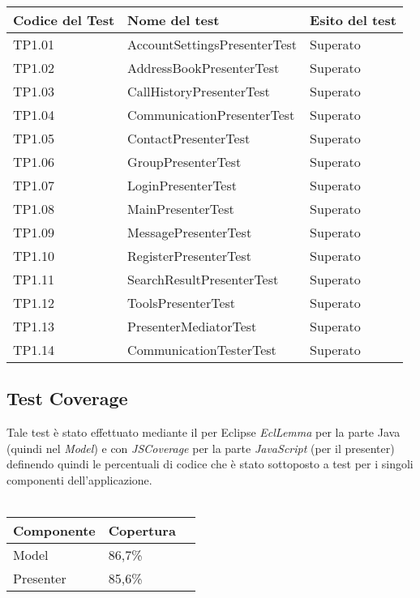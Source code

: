 \begin{center}
\begin{longtable}{p{}ll}
\toprule Codice del Test & Nome del test  & Esito del test\\
\midrule

TP1.01 & AccountSettingsPresenterTest &Superato\\
TP1.02 & AddressBookPresenterTest &Superato\\
TP1.03 & CallHistoryPresenterTest &Superato\\
TP1.04 & CommunicationPresenterTest &Superato\\
TP1.05 & ContactPresenterTest &Superato\\
TP1.06 & GroupPresenterTest &Superato\\
TP1.07 & LoginPresenterTest &Superato\\
TP1.08 & MainPresenterTest &Superato\\
TP1.09 & MessagePresenterTest &Superato\\
TP1.10 & RegisterPresenterTest &Superato\\
TP1.11 & SearchResultPresenterTest &Superato\\
TP1.12 & ToolsPresenterTest &Superato\\
TP1.13 & PresenterMediatorTest &Superato\\
TP1.14 & CommunicationTesterTest &Superato\\

\bottomrule
\end{longtable}
\end{center}

\subsection{Test Coverage}
Tale test è stato effettuato mediante il \underline{} per Eclipse \textit{EclLemma} per la parte Java (quindi nel \textit{Model}) e con \textit{JSCoverage} per la parte \textit{JavaScript} (per il presenter) definendo quindi le percentuali di codice che è stato sottoposto a test per i singoli componenti dell'applicazione.\\\\

\begin{center}
\begin{longtable}{p{}ll}
\toprule Componente & Copertura\\
\midrule
Model & 86,7\%\\
Presenter & 85,6\% \\
\bottomrule
\end{longtable}
\end{center}

